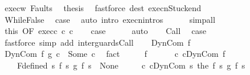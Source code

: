 \begin{isabellebody}
\ exec{\isacharunderscore}w\ Fault{\isacharunderscore}s{\isacharprime}{\isacharprime}\ \isamarkupfalse%
\ {\isacharquery}thesis\ \isamarkupfalse%
\ {\isacharparenleft}fastforce\ dest{\isacharcolon}\ execn{\isacharunderscore}Stuck{\isacharunderscore}end{\isacharparenright}\isanewline
\ \ \ \ \ \ \isamarkupfalse%
\isanewline
\ \ \ \ \isamarkupfalse%
\isanewline
\ \ \ \ \ \ \isamarkupfalse%
\ WhileFalse\ \isamarkupfalse%
\ {\isacharquery}case\ \isamarkupfalse%
\ {\isacharparenleft}auto\ intro{\isacharcolon}\ execn{\isachardot}intros{\isacharparenright}\isanewline
\ \ \ \ \isamarkupfalse%
\ {\isacharparenleft}simp{\isacharunderscore}all{\isacharparenright}\ \ \isanewline
\ \ \isacommand{{\isacharbraceright}}\isamarkupfalse%
\isanewline
\ \ \isamarkupfalse%
\ this\ {\isacharbrackleft}OF\ exec{\isacharunderscore}c\ c{\isacharbrackright}\ c{}\isanewline
\ \ \isamarkupfalse%
\ {\isacharquery}case\isanewline
\ \ \ \ \isamarkupfalse%
\ auto\isanewline
{}\isamarkupfalse%
\isanewline
\ \ \isamarkupfalse%
\ Call\ \isamarkupfalse%
\ {\isacharquery}case\ \isamarkupfalse%
\ {\isacharparenleft}fastforce\ simp\ add{\isacharcolon}\ inter{\isacharunderscore}guards{\isacharunderscore}Call{\isacharparenright}\isanewline
{}\isamarkupfalse%
\isanewline
\ \ \isamarkupfalse%
\ {\isacharparenleft}DynCom\ f{}{\isacharparenright}\isanewline
\ \ \isamarkupfalse%
\ {\isachardoublequoteopen}{\isacharparenleft}DynCom\ f{}\ {\isasyminter}\isactrlsub g\ c{}{\isacharparenright}\ {\isacharequal}\ Some\ c{\isachardoublequoteclose}\ \isamarkupfalse%
\ fact\isanewline
\ \ \isamarkupfalse%
\ \isamarkupfalse%
\ f{}\ \ \isanewline
\ \ \ \ c{}{\isacharcolon}\ {\isachardoublequoteopen}c{}{\isacharequal}DynCom\ f{}{\isachardoublequoteclose}\ \isanewline
\ \ \ \ F{\isacharunderscore}defined{\isacharcolon}\ {\isachardoublequoteopen}{\isasymforall}s{\isachardot}\ {\isacharparenleft}{\isacharparenleft}f{}\ s{\isacharparenright}\ {\isasyminter}\isactrlsub g\ {\isacharparenleft}f{}\ s{\isacharparenright}{\isacharparenright}\ {\isasymnoteq}\ None{\isachardoublequoteclose}\ \isanewline
\ \ \ \ c{\isacharcolon}\ {\isachardoublequoteopen}c{\isacharequal}DynCom\ {\isacharparenleft}{\isasymlambda}s{\isachardot}\ the\ {\isacharparenleft}{\isacharparenleft}f{}\ s{\isacharparenright}\ {\isasyminter}\isactrlsub g\ {\isacharparenleft}f{}\ s{\isacharparenright}{\isacharparenright}{\isacharparenright}{\isachardoublequoteclose}\isanewline

\end{isabellebody}
